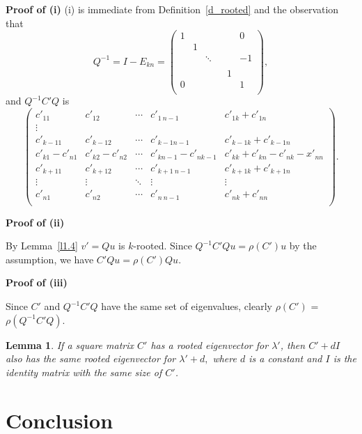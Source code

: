 \documentclass{article}
\theoremstyle{plain}
\newtheorem{lem}[thm]{Lemma}
\theoremstyle{definition}
\begin{document}
{\bf Proof of (i)} 
(i) is immediate from Definition~\ref{d_rooted} and the observation that 
$$Q^{-1}=I-E_{kn}=\begin{pmatrix}
1 &  & & &  & 0 \\
 & 1 &  &      &  &  \\
 &  & \ddots & &  & -1 \\
 &  &        & &  &  \\
  &  & & & 1 &  \\
0 &  & & &  & 1 \\
\end{pmatrix},$$
and $Q^{-1}C'Q$ is 
$$\begin{pmatrix}
c'_{11}     & c'_{12} & \cdots     & c'_{1\ n-1} & c'_{1k}+c'_{1n} \\
\vdots \\
c'_{k-11}     & c'_{k-1 2}           & \cdots     & c'_{k-1 n-1} & c'_{k-1k}+c'_{k-1n} \\
c'_{k1}-c'_{n1} & c'_{k2}-c'_{n2} &\cdots      &c'_{kn-1}-c'_{nk-1}& c'_{kk}+c'_{kn}-c'_{nk}-x'_{nn}\\
c'_{k+11}     & c'_{k+12}           & \cdots     & c'_{k+1\ n-1} & c'_{k+1k}+c'_{k+1n} \\
\vdots              & \vdots & \ddots              & \vdots & \vdots \\
c'_{n1}             & c'_{n2} & \cdots             & c'_{n\ n-1} & c'_{nk}+c'_{nn} \\
\end{pmatrix}.
$$




{\bf Proof of (ii)}

By Lemma~\ref{l1.4} $v'=Qu$ is $k$-rooted. 
Since $Q^{-1}C'Qu=\rho(C')u$ by the assumption, we have 
$C'Qu=\rho(C')Qu$.



{\bf Proof of (iii)}

Since $C'$ and $Q^{-1}C'Q$ have the same set of eigenvalues, clearly $\rho(C')$ = $\rho(Q^{-1}C'Q)$.

\begin{lem}\label{l_diag}
If a square matrix $C'$ has a rooted eigenvector for $\lambda'$, then $C'+dI$ also has
the same rooted eigenvector for $\lambda'+d,$ where $d$ is a constant and $I$ is the identity matrix with the same size of $C'$.
\end{lem}




\section{Conclusion}
\end{document}
